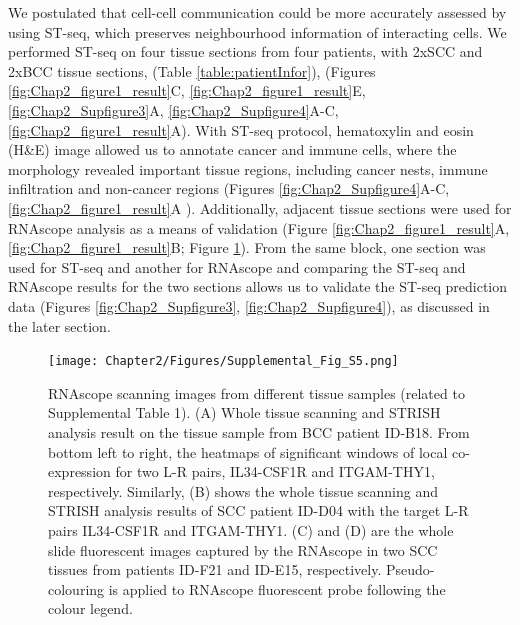 We postulated that cell-cell communication could be more accurately assessed by using ST-seq, which preserves neighbourhood information of interacting cells. We performed ST-seq on four tissue sections from four patients, with 2xSCC and 2xBCC tissue sections, (Table \ref{table:patientInfor}), (Figures \ref{fig:Chap2_figure1_result}C, \ref{fig:Chap2_figure1_result}E, \ref{fig:Chap2_Supfigure3}A, \ref{fig:Chap2_Supfigure4}A-C, \ref{fig:Chap2_figure1_result}A).  With ST-seq protocol, hematoxylin and eosin (H\&E) image allowed us to annotate cancer and immune cells, where the morphology revealed important tissue regions, including cancer nests, immune infiltration and non-cancer regions (Figures \ref{fig:Chap2_Supfigure4}A-C,\ref{fig:Chap2_figure1_result}A ). Additionally, adjacent tissue sections were used for RNAscope analysis as a means of validation (Figure \ref{fig:Chap2_figure1_result}A, \ref{fig:Chap2_figure1_result}B;  Figure \ref{fig:Chap2_Supfigure5}).  From the same block, one section was used for ST-seq and another for RNAscope and comparing the ST-seq and RNAscope results for the two sections allows us to validate the ST-seq prediction data (Figures \ref{fig:Chap2_Supfigure3}, \ref{fig:Chap2_Supfigure4}), as discussed in the later section. 

\begin{figure}[htp]
\centering
\texttt{[image: Chapter2/Figures/Supplemental\_Fig\_S5.png]}
\caption[RNAscope scanning images from different tissue samples]{RNAscope scanning images from different tissue samples (related to Supplemental Table 1). (A) Whole tissue scanning and STRISH analysis result on the tissue sample from BCC patient ID-B18. From bottom left to right, the heatmaps of significant windows of local co-expression for two L-R pairs, IL34-CSF1R and ITGAM-THY1, respectively. Similarly, (B) shows the whole tissue scanning and STRISH analysis results of SCC patient ID-D04 with the target L-R pairs IL34-CSF1R and ITGAM-THY1. (C) and (D) are the whole slide fluorescent images captured by the RNAscope in two SCC tissues from patients ID-F21 and ID-E15, respectively. Pseudo-colouring is applied to RNAscope fluorescent probe following the colour legend.}
\label{fig:Chap2_Supfigure5}
\end{figure}

